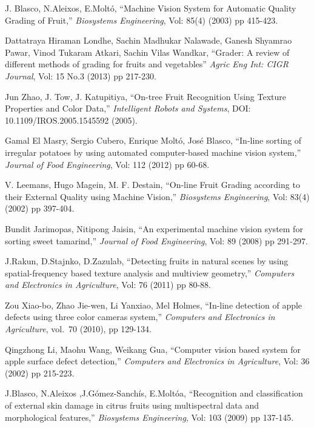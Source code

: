 \documentclass{bmvc2k}
\begin{document}
\begin{thebibliography}{1}
	
	J. Blasco, N.Aleixos, E.Moltó, ``Machine Vision System for Automatic Quality Grading of Fruit,'' {\em Biosystems Engineering}, Vol: 85(4) (2003) pp 415-423.
	
	Dattatraya Hiraman Londhe, Sachin Madhukar Nalawade, Ganesh Shyamrao Pawar, Vinod Tukaram Atkari, Sachin Vilas Wandkar, ``Grader: A review of different methods of grading for fruits and vegetables'' {\em Agric Eng Int: CIGR Journal}, Vol: 15 No.3 (2013) pp 217-230.
	
	Jun Zhao, J. Tow, J. Katupitiya, ``On-tree Fruit Recognition
	Using Texture Properties and Color Data,'' {\em Intelligent Robots and Systems}, DOI: 10.1109/IROS.2005.1545592 (2005).
	
	Gamal El Masry,  Sergio Cubero,  Enrique Moltó,  José Blasco, ``In-line sorting of irregular potatoes by using automated computer-based machine vision system,'' {\em Journal of Food Engineering}, Vol: 112 (2012) pp 60-68.
	
	V. Leemans, Hugo Magein, M. F. Destain, ``On-line Fruit Grading according to their External Quality using Machine Vision,'' {\em Biosystems Engineering}, Vol: 83(4) (2002) pp 397-404.
	
	Bundit Jarimopas, Nitipong Jaisin, ``An experimental machine vision system for sorting sweet tamarind,'' {\em Journal of Food Engineering}, Vol: 89 (2008) pp  291-297.
	
	J.Rakun, D.Stajnko, D.Zazulab, ``Detecting fruits in natural scenes by using spatial-frequency based texture analysis and multiview geometry,'' {\em Computers and Electronics in Agriculture}, Vol: 76 (2011) pp 80-88.
	
	Zou Xiao-bo, Zhao Jie-wen, Li Yanxiao, Mel Holmes, ``In-line detection of apple defects using three color cameras system,'' {\em Computers and Electronics in Agriculture}, vol.~70 (2010), pp 129-134.
	
	Qingzhong Li, Maohu Wang, Weikang Gua, ``Computer vision based system for apple surface defect detection,'' {\em Computers and Electronics in Agriculture}, Vol: 36 (2002) pp 215-223.
	
	J.Blasco, N.Aleixos ,J.Gómez-Sanchís, E.Moltóa, ``Recognition and classification of external skin damage in citrus fruits using multispectral data and morphological features,'' {\em Biosystems Engineering}, Vol: 103 (2009) pp 137-145.
	

\end{thebibliography}
\end{document}
